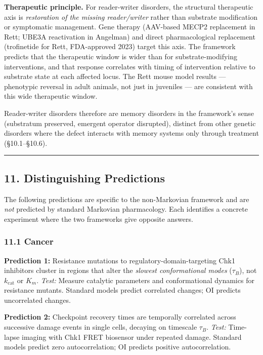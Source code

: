 \documentclass[
]{article}
\begin{document}
\textbf{Therapeutic principle.} For reader-writer disorders, the
structural therapeutic axis is \emph{restoration of the missing
reader/writer} rather than substrate modification or symptomatic
management. Gene therapy (AAV-based MECP2 replacement in Rett; UBE3A
reactivation in Angelman) and direct pharmacological replacement
(trofinetide for Rett, FDA-approved 2023) target this axis. The
framework predicts that the therapeutic window is wider than for
substrate-modifying interventions, and that response correlates with
timing of intervention relative to substrate state at each affected
locus. The Rett mouse model results --- phenotypic reversal in adult
animals, not just in juveniles --- are consistent with this wide
therapeutic window.

Reader-writer disorders therefore are memory disorders in the
framework's sense (substratum preserved, emergent operator disrupted),
distinct from other genetic disorders where the defect interacts with
memory systems only through treatment (§10.1--§10.6).

\begin{center}\rule{0.5\linewidth}{0.5pt}\end{center}

\hypertarget{distinguishing-predictions}{%
\subsection{11. Distinguishing
Predictions}\label{distinguishing-predictions}}

The following predictions are specific to the non-Markovian framework
and are \emph{not} predicted by standard Markovian pharmacology. Each
identifies a concrete experiment where the two frameworks give opposite
answers.

\hypertarget{cancer}{%
\subsubsection{11.1 Cancer}\label{cancer}}

\textbf{Prediction 1:} Resistance mutations to
regulatory-domain-targeting Chk1 inhibitors cluster in regions that
alter the \emph{slowest conformational modes} (\(\tau_B\)), not
\(k_{\text{cat}}\) or \(K_m\). \emph{Test:} Measure catalytic parameters
and conformational dynamics for resistance mutants. Standard models
predict correlated changes; OI predicts uncorrelated changes.

\textbf{Prediction 2:} Checkpoint recovery times are temporally
correlated across successive damage events in single cells, decaying on
timescale \(\tau_B\). \emph{Test:} Time-lapse imaging with Chk1 FRET
biosensor under repeated damage. Standard models predict zero
autocorrelation; OI predicts positive autocorrelation.
\end{document}
